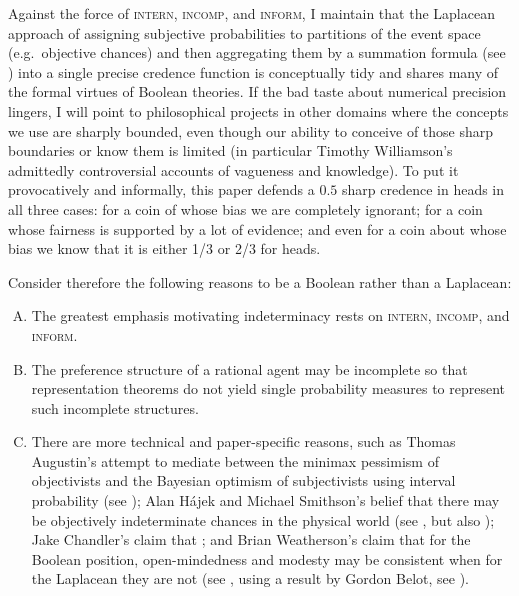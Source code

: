 \documentclass[11pt]{article}
\begin{document}
Against the force of \textsc{intern}, \textsc{incomp}, and
\textsc{inform}, I maintain that the La\-pla\-cean approach of
assigning subjective probabilities to partitions of the event space
(e.g.\ objective chances) and then aggregating them by a summation
formula (see ) into a single precise credence
function is conceptually tidy and shares many of the formal virtues of
Boolean theories. If the bad taste about numerical precision lingers,
I will point to philosophical projects in other domains where the
concepts we use are sharply bounded, even though our ability to
conceive of those sharp boundaries or know them is limited (in
particular Timothy Williamson's admittedly controversial accounts of
vagueness and knowledge). To put it provocatively and informally, this
paper defends a $0.5$ sharp credence in heads in all three cases: for
a coin of whose bias we are completely ignorant; for a coin whose
fairness is supported by a lot of evidence; and even for a coin about
whose bias we know that it is either 1/3 or 2/3 for heads.

Consider therefore the following reasons to be a Boolean rather than a
Laplacean:

\begin{enumerate}[(A)]
\item The greatest emphasis motivating indeterminacy rests on
  \textsc{intern}, \textsc{incomp}, and \textsc{inform}.
\item The preference structure of a rational agent may be incomplete
  so that representation theorems do not yield single probability
  measures to represent such incomplete
  structures.\label{page:houwieve}
\item There are more technical and paper-specific reasons, such as
  Thomas Augustin's attempt to mediate between the minimax pessimism
  of objectivists and the Bayesian optimism of subjectivists using
  interval probability (see ); Alan
  H{\'a}jek and Michael Smithson's belief that there may be
  objectively indeterminate chances in the physical world (see
  , but also ); Jake Chandler's claim that 
  ; and Brian Weatherson's claim that for the
  Boolean position, open-mindedness and modesty may be consistent when
  for the Laplacean they are not (see , using
  a result by Gordon Belot, see ).
\end{enumerate}
\end{document}
